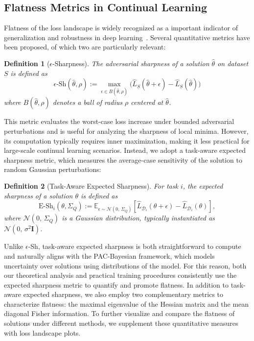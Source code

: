 \documentclass[letterpaper]{article} %
\newtheorem{definition}{Definition}
\begin{document}
\subsection{Flatness Metrics in Continual Learning}


Flatness of the loss landscape is widely recognized as a important indicator of generalization and robustness in deep learning~\citep{liVisualizingLossLandscape2018, foretSharpnessAwareMinimizationEfficiently2021}. Several quantitative metrics have been proposed, of which two are particularly relevant:

\begin{definition}[$\epsilon$-Sharpness]
The adversarial sharpness of a solution $\hat{\theta}$ on dataset $S$ is defined as
\begin{equation}
    \epsilon\text{-Sh}(\hat{\theta}, \rho) :=\max_{\epsilon \in B(\hat\theta, \rho)} \big( \hat{L}_{S}(\hat{\theta} + \epsilon) - \hat{L}_{S}(\hat{\theta}) \big)
\end{equation}
where $B(\hat\theta, \rho)$ denotes a ball of radius $\rho$ centered at $\hat\theta$.
\end{definition}

This metric evaluates the worst-case loss increase under bounded adversarial perturbations and is useful for analyzing the sharpness of local minima. However, its computation typically requires inner maximization, making it less practical for large-scale continual learning scenarios. Instead, we adopt a task-aware expected sharpness metric, which measures the average-case sensitivity of the solution to random Gaussian perturbations:

\begin{definition}[Task-Aware Expected Sharpness]
For task $i$, the expected sharpness of a solution $\theta$ is defined as
\begin{equation}
    \mathrm{E\text{-}Sh}_i(\theta, \Sigma_Q) := \mathbb{E}_{\epsilon \sim \mathcal{N}(0,\,\Sigma_Q)} \left[ \hat{L}_{\mathcal{D}_i}(\theta + \epsilon) - \hat{L}_{\mathcal{D}_i}(\theta) \right],
\end{equation}
where $\mathcal{N}(0,\,\Sigma_Q)$ is a Gaussian distribution, typically instantiated as $\mathcal{N}(0,\, \sigma^2 \mathbf{I})$.
\end{definition}

Unlike $\epsilon${-Sh}, task-aware expected sharpness is both straightforward to compute and naturally aligns with the PAC-Bayesian framework, which models uncertainty over solutions using distributions of the model. For this reason, both our theoretical analysis and practical training procedures consistently use the expected sharpness metric to quantify and promote flatness. In addition to task-aware expected sharpness, we also employ two complementary metrics to characterize flatness: the maximal eigenvalue of the Hessian matrix and the mean diagonal Fisher information. To further visualize and compare the flatness of solutions under different methods, we supplement these quantitative measures with loss landscape plots.
\end{document}
